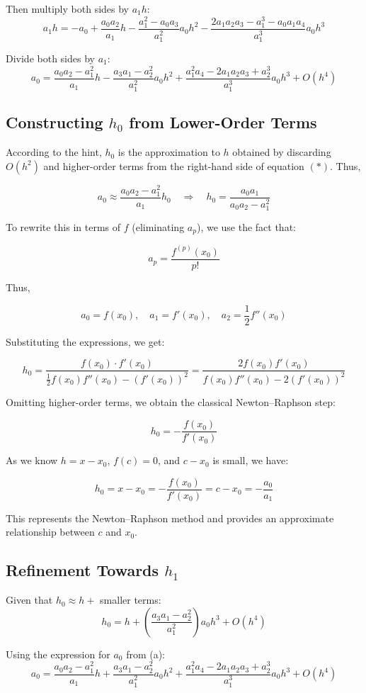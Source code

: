 \documentclass[12pt]{article}
\begin{document}
Then multiply both sides by \( a_1 h \):
\[
a_1 h = -a_0 + \frac{a_0 a_2}{a_1} h - \frac{a_1^2 - a_0 a_3}{a_1^2} a_0 h^2 - \frac{2 a_1 a_2 a_3 - a_1^3 - a_0 a_1 a_4}{a_1^3} a_0 h^3
\]

Divide both sides by \( a_1 \):
\[
a_0 = \frac{a_0 a_2 - a_1^2}{a_1} h - \frac{a_3 a_1 - a_2^2}{a_1^2} a_0 h^2 + \frac{a_1^2 a_4 - 2 a_1 a_2 a_3 + a_2^3}{a_1^3} a_0 h^3 + O(h^4)
\]
\subsection*{Constructing $h_0$ from Lower-Order Terms}

According to the hint, $h_0$ is the approximation to $h$ obtained by discarding $O(h^2)$ and higher-order terms from the right-hand side of equation $(*)$. Thus,

\[
a_0 \approx \frac{a_0 a_2 - a_1^2}{a_1} h_0 \quad \Rightarrow \quad h_0 = \frac{a_0 a_1}{a_0 a_2 - a_1^2}
\]

To rewrite this in terms of $f$ (eliminating $a_p$), we use the fact that:

\[
a_p = \frac{f^{(p)}(x_0)}{p!}
\]

Thus,

\[
a_0 = f(x_0), \quad a_1 = f'(x_0), \quad a_2 = \frac{1}{2} f''(x_0)
\]

Substituting the expressions, we get:

\[
h_0 = \frac{f(x_0) \cdot f'(x_0)}{\frac{1}{2} f(x_0) f''(x_0) - \left(f'(x_0)\right)^2}
= \frac{2 f(x_0) f'(x_0)}{f(x_0) f''(x_0) - 2 \left(f'(x_0)\right)^2}
\]

Omitting higher-order terms, we obtain the classical Newton–Raphson step:

\[
h_0 = -\frac{f(x_0)}{f'(x_0)}
\]

As we know $h = x - x_0$, $f(c) = 0$, and $c - x_0$ is small, we have:

\[
h_0 = x - x_0 = -\frac{f(x_0)}{f'(x_0)} = c - x_0 = -\frac{a_0}{a_1}
\]

This represents the Newton–Raphson method and provides an approximate relationship between $c$ and $x_0$.
\subsection*{Refinement Towards $h_1$}

Given that $h_0 \approx h +$ smaller terms:
\[
h_0 = h + \left( \frac{a_3 a_1 - a_2^2}{a_1^2} \right) a_0 h^3 + O(h^4)
\]

Using the expression for $a_0$ from (a):
\[
a_0 = \frac{a_0 a_2 - a_1^2}{a_1} h + \frac{a_3 a_1 - a_2^2}{a_1^2} a_0 h^2 + \frac{a_1^2 a_4 - 2 a_1 a_2 a_3 + a_2^3}{a_1^3} a_0 h^3 + O(h^4)
\]
\end{document}
